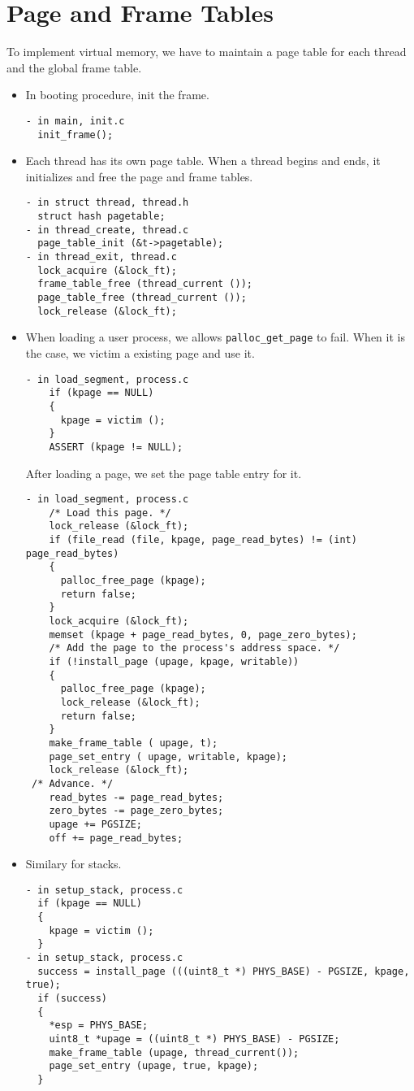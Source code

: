 \documentclass[a4paper,article,11pt,oneside]{article}
\begin{document}
\section{Page and Frame Tables}\label{sectables}
To implement virtual memory, we have to maintain a page table for each
thread and the global frame table.
\begin{itemize}
\item In booting procedure, init the frame.
\begin{verbatim}
- in main, init.c
  init_frame();
\end{verbatim}
\item Each thread has its own page table. When a thread begins and
  ends, it initializes and free the page and frame tables.
\begin{verbatim}
- in struct thread, thread.h
  struct hash pagetable;
- in thread_create, thread.c
  page_table_init (&t->pagetable);
- in thread_exit, thread.c
  lock_acquire (&lock_ft);
  frame_table_free (thread_current ());
  page_table_free (thread_current ());
  lock_release (&lock_ft);
\end{verbatim}
\item When loading a user process, we allows
  \texttt{palloc\_get\_page} to fail. When it is the case, we victim a
  existing page and use it.
\begin{verbatim}
- in load_segment, process.c
    if (kpage == NULL)
    {
      kpage = victim ();
    }
    ASSERT (kpage != NULL);
\end{verbatim}
After loading a page, we set the page table entry for it.
\begin{verbatim}
- in load_segment, process.c
    /* Load this page. */
    lock_release (&lock_ft);
    if (file_read (file, kpage, page_read_bytes) != (int) page_read_bytes)
    {
      palloc_free_page (kpage);
      return false; 
    }
    lock_acquire (&lock_ft);
    memset (kpage + page_read_bytes, 0, page_zero_bytes);
    /* Add the page to the process's address space. */
    if (!install_page (upage, kpage, writable)) 
    {
      palloc_free_page (kpage);
      lock_release (&lock_ft);
      return false; 
    }
    make_frame_table ( upage, t);
    page_set_entry ( upage, writable, kpage);
    lock_release (&lock_ft);
 /* Advance. */
    read_bytes -= page_read_bytes;
    zero_bytes -= page_zero_bytes;
    upage += PGSIZE;
    off += page_read_bytes;
\end{verbatim}
\item Similary for stacks.
\begin{verbatim}
- in setup_stack, process.c
  if (kpage == NULL)
  {
    kpage = victim ();
  }
- in setup_stack, process.c
  success = install_page (((uint8_t *) PHYS_BASE) - PGSIZE, kpage, true);
  if (success)
  {
    *esp = PHYS_BASE;
    uint8_t *upage = ((uint8_t *) PHYS_BASE) - PGSIZE;
    make_frame_table (upage, thread_current());
    page_set_entry (upage, true, kpage);
  }
\end{verbatim}
\end{itemize}
\end{document}
